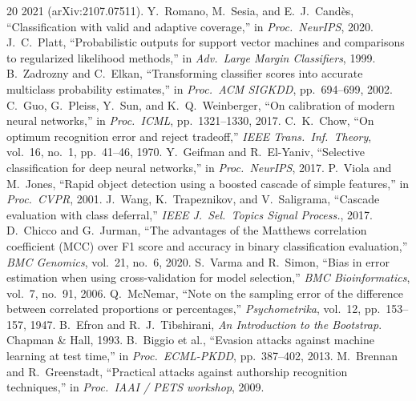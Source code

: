 \documentclass[conference]{IEEEtran}
\begin{document}
\begin{thebibliography}{20}
2021 (arXiv:2107.07511).
 Y.~Romano, M.~Sesia, and E.~J.~Cand\`es, ``Classification with valid and
adaptive coverage,'' in \emph{Proc.\ NeurIPS}, 2020.
 J.~C.~Platt, ``Probabilistic outputs for support vector machines and
comparisons to regularized likelihood methods,'' in \emph{Adv.\ Large Margin Classifiers}, 1999.
 B.~Zadrozny and C.~Elkan, ``Transforming classifier scores into accurate
multiclass probability estimates,'' in \emph{Proc.\ ACM SIGKDD}, pp.~694--699, 2002.
 C.~Guo, G.~Pleiss, Y.~Sun, and K.~Q.~Weinberger, ``On calibration of modern
neural networks,'' in \emph{Proc.\ ICML}, pp.~1321--1330, 2017.
 C.~K.~Chow, ``On optimum recognition error and reject tradeoff,''
\emph{IEEE Trans.\ Inf.\ Theory}, vol.~16, no.~1, pp.~41--46, 1970.
 Y.~Geifman and R.~El-Yaniv, ``Selective classification for deep neural
networks,'' in \emph{Proc.\ NeurIPS}, 2017.
 P.~Viola and M.~Jones, ``Rapid object detection using a boosted cascade of
simple features,'' in \emph{Proc.\ CVPR}, 2001.
 J.~Wang, K.~Trapeznikov, and V.~Saligrama, ``Cascade evaluation with class
deferral,'' \emph{IEEE J.\ Sel.\ Topics Signal Process.}, 2017.
 D.~Chicco and G.~Jurman, ``The advantages of the Matthews correlation
coefficient (MCC) over F1 score and accuracy in binary classification evaluation,''
\emph{BMC Genomics}, vol.~21, no.~6, 2020.
 S.~Varma and R.~Simon, ``Bias in error estimation when using cross-validation
for model selection,'' \emph{BMC Bioinformatics}, vol.~7, no.~91, 2006.
 Q.~McNemar, ``Note on the sampling error of the difference between
correlated proportions or percentages,'' \emph{Psychometrika}, vol.~12, pp.~153--157, 1947.
 B.~Efron and R.~J.~Tibshirani, \emph{An Introduction to the Bootstrap}.
Chapman \& Hall, 1993.
 B.~Biggio et al., ``Evasion attacks against machine learning at test time,''
in \emph{Proc.\ ECML-PKDD}, pp.~387--402, 2013.
 M.~Brennan and R.~Greenstadt, ``Practical attacks against authorship
recognition techniques,'' in \emph{Proc.\ IAAI / PETS workshop}, 2009.
\end{thebibliography}
\end{document}
